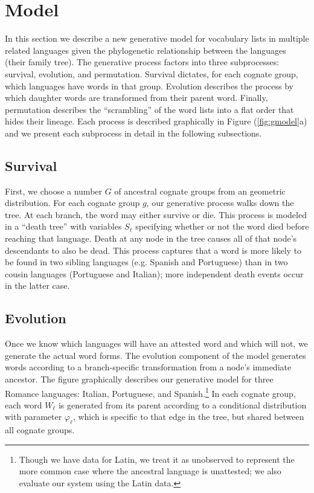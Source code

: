 \documentclass[11pt,a4paper]{article}
\begin{document}
\section{Model}

In this section we describe a new generative model for vocabulary
lists in multiple related languages given the phylogenetic relationship
between the languages (their family tree). The generative process
factors into three subprocesses: survival, evolution, and permutation.
Survival dictates, for each cognate group, which languages have
words in that group. Evolution describes the process by which
daughter words are transformed from their parent word. Finally,
permutation describes the ``scrambling'' of the word lists into a
flat order that hides their lineage. Each process is described
graphically in Figure (\ref{fig:gmodel}a) and we present each
subprocess in detail in the following subsections.

\subsection{Survival}

First, we choose a number $G$ of ancestral cognate groups from an
geometric distribution. For each cognate group $g$, our generative
process walks down the tree.  At each branch, the word may either
survive or die.  This process is modeled in a ``death tree'' with
variables $S_\ell$ specifying whether or not the word died before
reaching that language. Death at any node in the tree causes all
of that node's descendants to also be dead.  This process captures
that a word is more likely to be found in two sibling languages
(e.g. Spanish and Portuguese) than in two cousin languages (Portuguese
and Italian); more independent death events occur in the latter
case.

\subsection{Evolution}

Once we know which languages will have an attested word and which
will not, we generate the actual word forms. The evolution component of
the model generates words according to a branch-specific transformation from a node's 
immediate ancestor.  The figure graphically describes our generative
model for three Romance languages: Italian, Portuguese, and Spanish.\footnote{Though we have data for Latin, we treat it
as unobserved to represent the more common case where the ancestral language is unattested; we also evaluate our system
using the Latin data.}
In each cognate group, each word $W_\ell$ is generated from its
parent according to a conditional distribution with parameter $\varphi_\ell$,
which is specific to that edge in the tree, but shared between all
cognate groups.
\end{document}
